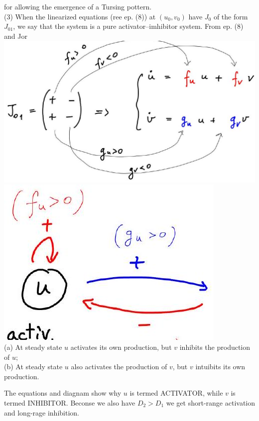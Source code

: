 \documentclass[10pt]{article}
\begin{document}
for allowing the emergence of a Tursing pottern.\\
(3) When the linearized equations (ree ep. (8)) at $\left(u_{0}, v_{0}\right)$ have $J_{0}$ of the form $J_{01}$, we say that the system is a pure activator--imhibitor system. From ep. (8) and Jor\\
\includegraphics[max width=\textwidth, center]{2025_10_17_3cf351a4349ae3691080g-12(4)}\\
\includegraphics[max width=\textwidth, center]{2025_10_17_3cf351a4349ae3691080g-12}\\
(a) At steady state $u$ activates its own production, but $v$ inhibits the production of $u$;\\
(b) At steady state $u$ also activates the production of $v$, but $v$ intuibits its own production.

The equations and diagnam show why $u$ is termed ACTIVATOR, while $v$ is termed INHIBITOR. Beconse we also have $D_{2}>D_{1}$ we get short-range activation and long-rage inhibition.
\end{document}
